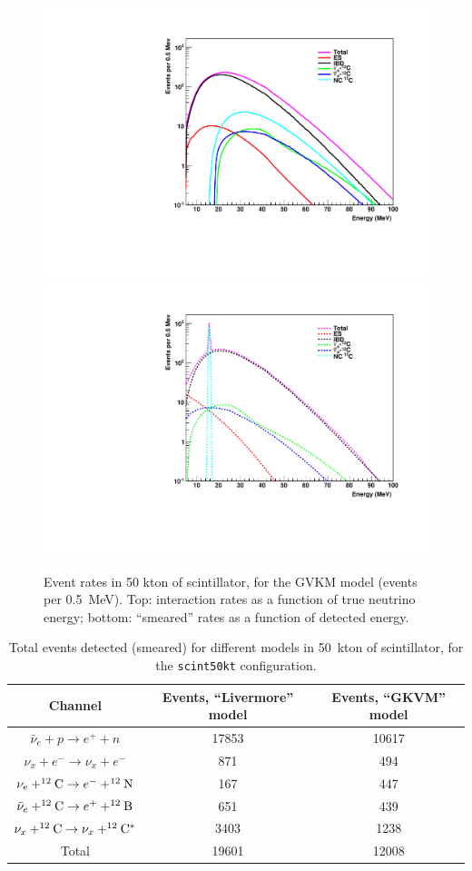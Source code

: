 \documentclass[12pt]{article}
\begin{document}
\begin{figure}[htb]
  \centering\includegraphics[width=.75\textwidth]{figures/interaction_rates_gvkm_scint50kt.pdf}
  \centering\includegraphics[width=.75\textwidth]{figures/smeared_rates_gvkm_scint50kt.pdf}

  \caption{Event rates in 50 kton of scintillator, for the GVKM model
  (events per 0.5~MeV). Top: interaction rates as a
    function of true neutrino energy; bottom:  ``smeared''
    rates as a function of detected energy.}
  \label{fig:scintrates}
\end{figure}

\begin{table}[h]
\centering
\begin{tabular}{|c|c|c|}
\hline
Channel & Events, ``Livermore'' model & Events, ``GKVM'' model  \\
\hline
   $\bar{\nu}_e+ p \rightarrow e^+ + n$                  &  17853 &   10617\\
$\nu_x + e^- \rightarrow \nu_x + e^-$                           & 871 &   494\\
$\nu_e + ^{12}{\rm C} \rightarrow e^- + ^{12}{\rm N}$         & 167  &  447  \\
$\bar{\nu}_e + ^{12}{\rm C} \rightarrow e^+ + ^{12}{\rm B}$  & 651 &  439 \\


$\nu_x + ^{12}{\rm C} \rightarrow \nu_x+ ^{12}{\rm C}^*$
                         &  3403 &  1238 \\ \hline
Total &  19601 & 12008 \\ \hline
\end{tabular}
\caption{Total events detected (smeared) for different models in 50~kton of scintillator, for the
\texttt{scint50kt} configuration. }
\label{tab:scinttable}
\end{table}
\end{document}
